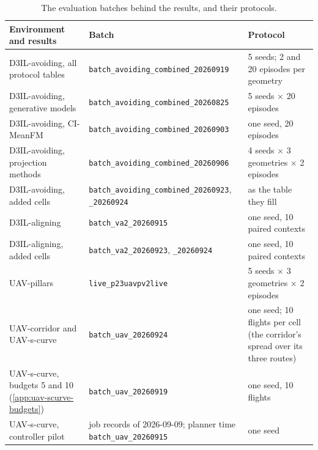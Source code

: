 \begin{table}[htpb]
  \caption[Corpora of record]{The evaluation batches behind the results, and their protocols.}
  \label{tab:corpora}
  \centering
  \small
  \begin{tabularx}{\linewidth}{@{}L L L@{}}
    \toprule
    Environment and results & Batch & Protocol \\
    \midrule
    D3IL-avoiding, all protocol tables & \texttt{batch\_avoiding\_combined\_20260919} & 5 seeds; 2 and 20 episodes per geometry \\
    D3IL-avoiding, generative models & \texttt{batch\_avoiding\_combined\_20260825} & 5 seeds $\times$ 20 episodes \\
    D3IL-avoiding, CI-MeanFM & \texttt{batch\_avoiding\_combined\_20260903} & one seed, 20 episodes \\
    D3IL-avoiding, projection methods & \texttt{batch\_avoiding\_combined\_20260906} & 4 seeds $\times$ 3 geometries $\times$ 2 episodes \\
    D3IL-avoiding, added cells & \texttt{batch\_avoiding\_combined\_20260923}, \texttt{\_20260924} & as the table they fill \\
    D3IL-aligning & \texttt{batch\_va2\_20260915} & one seed, 10 paired contexts \\
    D3IL-aligning, added cells & \texttt{batch\_va2\_20260923}, \texttt{\_20260924} & one seed, 10 paired contexts \\
    UAV-pillars & \texttt{live\_p23uavpv2live} & 5 seeds $\times$ 3 geometries $\times$ 2 episodes \\
    UAV-corridor and UAV-s-curve & \texttt{batch\_uav\_20260924} & one seed; 10 flights per cell (the corridor's spread over its three routes) \\
    UAV-s-curve, budgets 5 and 10 (\autoref{app:uav-scurve-budgets}) & \texttt{batch\_uav\_20260919} & one seed, 10 flights \\
    UAV-s-curve, controller pilot & job records of 2026-09-09; planner time \texttt{batch\_uav\_20260915} & one seed \\
    \bottomrule
  \end{tabularx}
\end{table}

